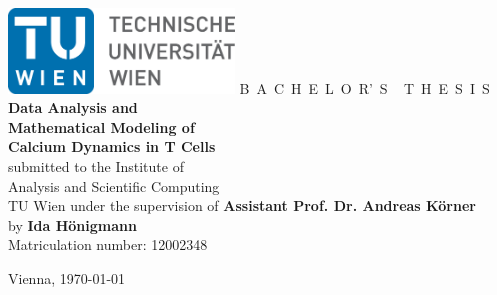 \documentclass[a4paper,11pt,bibliography=totoc,listof=totoc,headinclude=true,cleardoublepage=empty]{scrbook}
\begin{document}

\begin{titlepage}
	\begin{center}
		\includegraphics[width=0.45\textwidth]{fig/TULogo.eps}
		\vskip 1cm
		{\LARGE B~\Large A~C~H~E~L~O~R'~S ~ \LARGE T~\Large H~E~S~I~S}
		\vskip 8mm
		{\huge\bfseries
			Data Analysis and \\ Mathematical Modeling of \\ Calcium Dynamics in T Cells \\ [1ex]}
		\vskip 1cm
		\large 
		submitted to the    
		\vskip 0.75cm
		{\Large Institute of\\[1ex] Analysis and Scientific Computing}\\[1ex]
		{\Large TU Wien}
		\vskip0.75cm
		under the supervision of
		\vskip0.75cm
		{\Large\bfseries Assistant Prof. Dr. Andreas Körner}\\
		\vskip0.75cm
		by
		\vskip 0.75cm
		{\Large\bfseries Ida Hönigmann}\\[1ex]
		{Matriculation number: 12002348}\\[1ex]
	\end{center}
	
	\vfill
	
	\small
	Vienna, \today 
	\vspace*{-15mm}
\end{titlepage}

\end{document}
